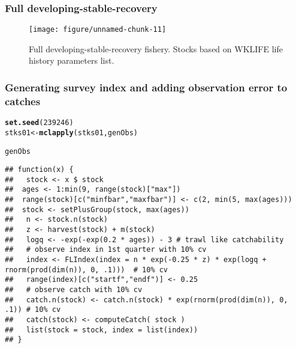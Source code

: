 \documentclass[a4paper]{article}\usepackage{graphicx, color}
\makeatletter
\def\maxwidth{ %
  \ifdim\Gin@nat@width>\linewidth
    \linewidth
  \else
    \Gin@nat@width
  \fi
}
\newcommand{\hlfunctioncall}[1]{\textcolor[rgb]{0.501960784313725,0,0.329411764705882}{\textbf{#1}}}%
\newenvironment{kframe}{%
 \def\at@end@of@kframe{}%
 \ifinner\ifhmode%
  \def\at@end@of@kframe{\end{minipage}}%
  \begin{minipage}{\columnwidth}%
 \fi\fi%
 \def\FrameCommand##1{\hskip\@totalleftmargin \hskip-\fboxsep
 \colorbox{shadecolor}{##1}\hskip-\fboxsep
     \hskip-\linewidth \hskip-\@totalleftmargin \hskip\columnwidth}%
 \MakeFramed {\advance\hsize-\width
   \@totalleftmargin\z@ \linewidth\hsize
   \@setminipage}}%
 {\par\unskip\endMakeFramed%
 \at@end@of@kframe}
\newenvironment{knitrout}{}{} %
\makeatother
\begin{document}
\subsubsection*{Full developing-stable-recovery}
\begin{knitrout}
\color{fgcolor}\begin{figure}[H]


{\centering \texttt{[image: figure/unnamed-chunk-11]} 

}

\caption[Full developing-stable-recovery fishery]{Full developing-stable-recovery fishery. Stocks based on WKLIFE life history parameters list.\label{fig:unnamed-chunk-11}}
\end{figure}

\end{knitrout}


\subsubsection*{Generating survey index and adding observation error to catches}

\begin{knitrout}
\color{fgcolor}\begin{kframe}
\begin{alltt}
\hlfunctioncall{set.seed}(239246)
stks01 <- \hlfunctioncall{mclapply}(stks01, genObs)
\end{alltt}
\end{kframe}
\end{knitrout}


\begin{knitrout}
\color{fgcolor}\begin{kframe}
\begin{alltt}
genObs
\end{alltt}
\begin{verbatim}
## function(x) {
##   stock <- x $ stock	
## 	ages <- 1:min(9, range(stock)["max"])
## 	range(stock)[c("minfbar","maxfbar")] <- c(2, min(5, max(ages)))
## 	stock <- setPlusGroup(stock, max(ages))
##   n <- stock.n(stock)
##   z <- harvest(stock) + m(stock)
##   logq <- -exp(-exp(0.2 * ages)) - 3 # trawl like catchability
##   # observe index in 1st quarter with 10% cv
##   index <- FLIndex(index = n * exp(-0.25 * z) * exp(logq + rnorm(prod(dim(n)), 0, .1)))  # 10% cv
##   range(index)[c("startf","endf")] <- 0.25
##   # observe catch with 10% cv
##   catch.n(stock) <- catch.n(stock) * exp(rnorm(prod(dim(n)), 0, .1)) # 10% cv
##   catch(stock) <- computeCatch( stock )
##   list(stock = stock, index = list(index))
## }
\end{verbatim}
\end{kframe}
\end{knitrout}
\end{document}
